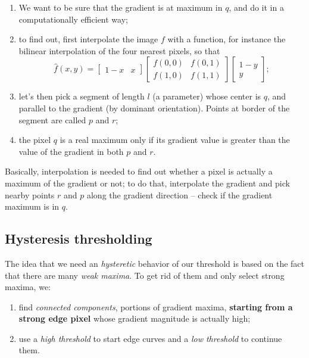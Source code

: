 \documentclass[10pt]{report}
\begin{document}
\begin{enumerate}
\item We want to be sure that the gradient is at maximum in \(q\), and do
it in a computationally efficient way;
\item to find out, first interpolate the image \(f\) with a function, for
instance the bilinear interpolation of the four nearest pixels, so
that
\[\hat{f}(x, y) = \begin{bmatrix}1 - x & x\end{bmatrix}\begin{bmatrix}f(0,0) & f(0, 1) \\ f(1,0) & f(1,1)\end{bmatrix}\begin{bmatrix}1 - y \\ y\end{bmatrix};\]
\item let's then pick a segment of length \(l\) (a parameter) whose center
is \(q\), and parallel to the gradient (by dominant orientation).
Points at border of the segment are called \(p\) and \(r\);
\item the pixel \(q\) is a real maximum only if its gradient value is
greater than the value of the gradient in both \(p\) and \(r\).
\end{enumerate}

Basically, interpolation is needed to find out whether a pixel is
actually a maximum of the gradient or not; to do that, interpolate the
gradient and pick nearby points \(r\) and \(p\) along the gradient
direction -- check if the gradient maximum is in \(q\).

\subsection{Hysteresis thresholding}
\label{hysteresis-thresholding}
The idea that we need an \emph{hysteretic} behavior of our threshold is based
on the fact that there are many \emph{weak maxima}. To get rid of them and
only select strong maxima, we:

\begin{enumerate}
\item find \emph{connected components}, portions of gradient maxima, \textbf{starting
from a strong edge pixel} whose gradient magnitude is actually high;
\item use a \emph{high threshold} to start edge curves and a \emph{low threshold} to
continue them.
\end{enumerate}
\end{document}
